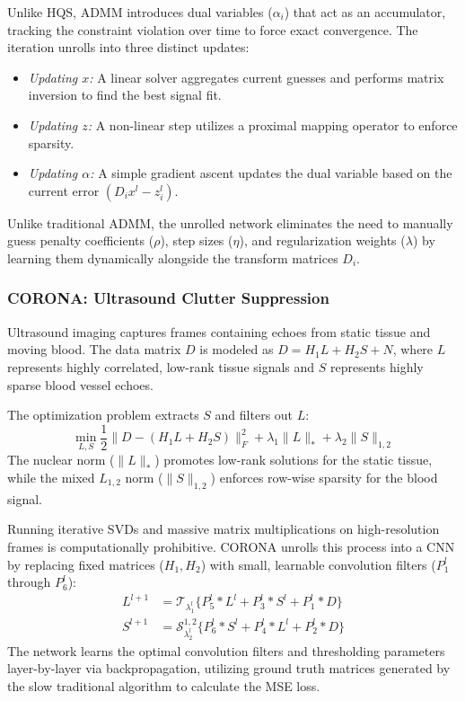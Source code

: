 \documentclass[conference]{IEEEtran}
\begin{document}
Unlike HQS, ADMM introduces dual variables ($\alpha_i$) that act as an accumulator, tracking the constraint violation over time to force exact convergence. The iteration unrolls into three distinct updates:
\begin{itemize}
    \item \textit{Updating $x$:} A linear solver aggregates current guesses and performs matrix inversion to find the best signal fit.
    \item \textit{Updating $z$:} A non-linear step utilizes a proximal mapping operator to enforce sparsity.
    \item \textit{Updating $\alpha$:} A simple gradient ascent updates the dual variable based on the current error $(D_i x^l - z_i^l)$.
\end{itemize}
Unlike traditional ADMM, the unrolled network eliminates the need to manually guess penalty coefficients ($\rho$), step sizes ($\eta$), and regularization weights ($\lambda$) by learning them dynamically alongside the transform matrices $D_i$.

\subsubsection{CORONA: Ultrasound Clutter Suppression}
Ultrasound imaging captures frames containing echoes from static tissue and moving blood. The data matrix $D$ is modeled as $D = H_1 L + H_2 S + N$, where $L$ represents highly correlated, low-rank tissue signals and $S$ represents highly sparse blood vessel echoes. 

The optimization problem extracts $S$ and filters out $L$:
\begin{equation}
\min_{L,S} \frac{1}{2}\|D - (H_1 L + H_2 S)\|_F^2 + \lambda_1\|L\|_* + \lambda_2\|S\|_{1,2}
\end{equation}
The nuclear norm ($\|L\|_*$) promotes low-rank solutions for the static tissue, while the mixed $L_{1,2}$ norm ($\|S\|_{1,2}$) enforces row-wise sparsity for the blood signal. 

Running iterative SVDs and massive matrix multiplications on high-resolution frames is computationally prohibitive. CORONA unrolls this process into a CNN by replacing fixed matrices ($H_1, H_2$) with small, learnable convolution filters ($P_1^l$ through $P_6^l$):
\begin{align}
L^{l+1} &= \mathcal{T}_{\lambda_1^l}\{P_5^l * L^l + P_3^l * S^l + P_1^l * D\} \\
S^{l+1} &= \mathcal{S}_{\lambda_2^l}^{1,2}\{P_6^l * S^l + P_4^l * L^l + P_2^l * D\}
\end{align}
The network learns the optimal convolution filters and thresholding parameters layer-by-layer via backpropagation, utilizing ground truth matrices generated by the slow traditional algorithm to calculate the MSE loss.
\end{document}
